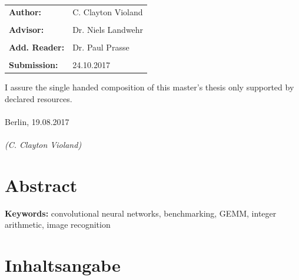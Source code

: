 \documentclass[12pt]{report}
\begin{document}
\vfill

\begin{tabular}{ll}
{\Large \bf Author:} & {\Large C. Clayton Violand} \\\\
{\Large \bf Advisor:} & {\Large Dr. Niels Landwehr} \\\\
{\Large \bf Add. Reader:} & {\Large Dr. Paul Prasse} \\\\
{\Large \bf Submission:} & {\Large 24.10.2017}
\end{tabular}

\newpage	
\thispagestyle{empty}
\hoffset=0mm
\vspace*{\fill}
\noindent I assure the single handed composition of this master's thesis only supported by declared resources.\\\\
Berlin, 19.08.2017\\\\
\noindent \textit{(C. Clayton Violand)}

\newpage
\thispagestyle{empty}
\null

\newpage
\thispagestyle{empty}
\hoffset=0mm
\section*{Abstract}	
\begin{spacing}{1.2}

\end{spacing}

\bigskip
\providecommand{\keywords}[1]{\textbf{Keywords:} #1}
\keywords{convolutional neural networks, benchmarking, GEMM, integer arithmetic, image recognition}

\section*{Inhaltsangabe}
\begin{spacing}{1.2}

\end{spacing}

\newpage
\hoffset=0mm
\setcounter{tocdepth}{3}
\setcounter{secnumdepth}{3}
\fboxsep 0mm

\newpage
\setlength{\baselineskip}{3ex}

\setcounter{page}{1}
\tableofcontents

\newpage
{}
\listoftables\begin{center}\end{center}
\end{document}
